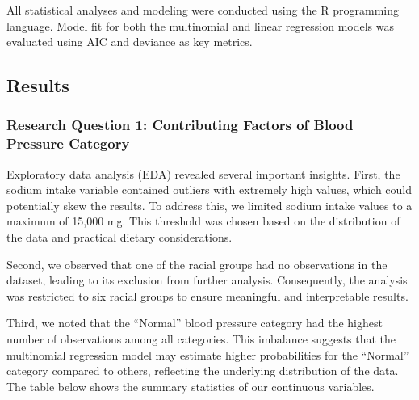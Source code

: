\documentclass[
  letterpaper,
  DIV=11,
  numbers=noendperiod]{scrartcl}
\begin{document}
All statistical analyses and modeling were conducted using the R
programming language. Model fit for both the multinomial and linear
regression models was evaluated using AIC and deviance as key metrics.

\subsection{Results}\label{results}

\subsubsection{Research Question 1: Contributing Factors of Blood
Pressure
Category}\label{research-question-1-contributing-factors-of-blood-pressure-category}

Exploratory data analysis (EDA) revealed several important insights.
First, the sodium intake variable contained outliers with extremely high
values, which could potentially skew the results. To address this, we
limited sodium intake values to a maximum of 15,000 mg. This threshold
was chosen based on the distribution of the data and practical dietary
considerations.

Second, we observed that one of the racial groups had no observations in
the dataset, leading to its exclusion from further analysis.
Consequently, the analysis was restricted to six racial groups to ensure
meaningful and interpretable results.

Third, we noted that the ``Normal'' blood pressure category had the
highest number of observations among all categories. This imbalance
suggests that the multinomial regression model may estimate higher
probabilities for the ``Normal'' category compared to others, reflecting
the underlying distribution of the data. The table below shows the
summary statistics of our continuous variables.
\end{document}
